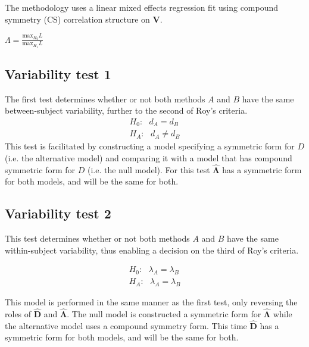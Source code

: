 \documentclass[12pt, a4paper]{report}
\theoremstyle{plain}
\theoremstyle{definition}
\theoremstyle{remark}
\begin{document}


The methodology uses a linear mixed effects regression fit using
compound symmetry (CS) correlation structure on \textbf{V}.

$\Lambda = \frac{\mbox{max}_{H_{0}}L}{\mbox{max}_{H_{1}}L}$

\subsection{Variability test 1}
The first test determines whether or not both methods $A$ and $B$ have the same between-subject variability, further to the second of Roy's criteria.
\begin{eqnarray*}
	H_{0}: \mbox{ }d_{A}  = d_{B} \\
	H_{A}: \mbox{ }d_{A}  \neq d_{B}
\end{eqnarray*}
This test is facilitated by constructing a model specifying a symmetric form for $D$ (i.e. the alternative model) and comparing it with a model that has compound symmetric form for $D$ (i.e. the null model). For this test $\boldsymbol{\hat{\Lambda}}$ has a symmetric form for both models, and will be the same for both.



\subsection{Variability test 2}

This test determines whether or not both methods $A$ and $B$ have the same within-subject variability, thus enabling a decision on the third of Roy's criteria.

\begin{eqnarray*}
	H_{0}: \mbox{ }\lambda_{A}  = \lambda_{B} \\
	H_{A}: \mbox{ }\lambda_{A}  = \lambda_{B}
\end{eqnarray*}

This model is performed in the same manner as the first test, only reversing the roles of $\boldsymbol{\hat{D}}$ and $\boldsymbol{\hat{\Lambda}}$. The null model is constructed a symmetric form for $\boldsymbol{\hat{\Lambda}}$ while the alternative model uses a compound symmetry form. This time $\boldsymbol{\hat{D}}$ has a symmetric form for both models, and will be the same for both.
\end{document}
